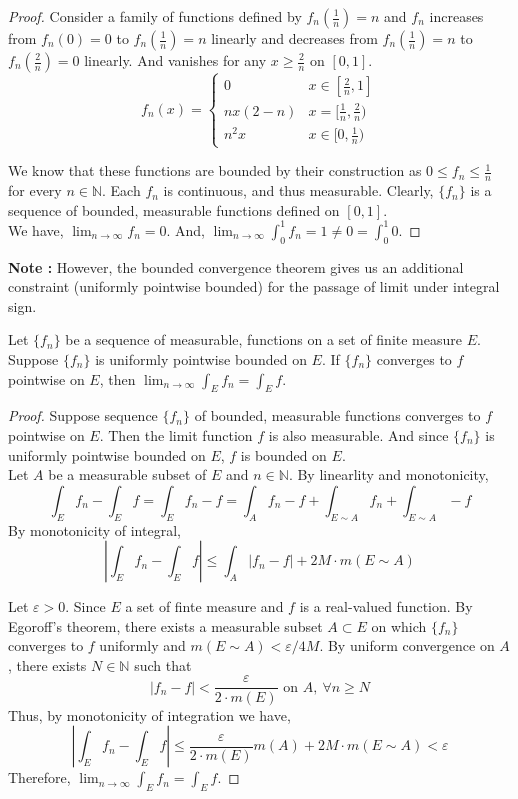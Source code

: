 \begin{proof}
	Consider a family of functions defined by $f_n(\frac{1}{n}) = n$ and $f_n$ increases from $f_n(0) = 0$ to $f_n(\frac{1}{n}) = n$ linearly and decreases from $f_n(\frac{1}{n}) = n$ to $f_n(\frac{2}{n}) = 0$ linearly. And vanishes for any $x \ge \frac{2}{n}$ on $[0,1]$.
	\[ f_n(x) = \begin{cases} 0 & x \in [\frac{2}{n},1] \\ nx(2-n) & x = [\frac{1}{n},\frac{2}{n}) \\ n^2 x & x \in [0,\frac{1}{n}) \end{cases} \]

	We know that these functions are bounded by their construction as $0 \le f_n \le \frac{1}{n}$ for every $n \in \mathbb{N}$.
	Each $f_n$ is continuous, and thus measurable.
	Clearly, $\{ f_n \}$ is a sequence of bounded, measurable functions defined on $[0,1]$.\\

	We have, $\displaystyle \lim_{n \to \infty} f_n = 0$.
	And, $\displaystyle \lim_{n \to \infty}\int_0^1 f_n  = 1 \ne 0 = \int_0^1 0$.
\end{proof}
	\textbf{Note :} However, the bounded convergence theorem gives us an additional constraint (uniformly pointwise bounded) for the passage of limit under integral sign.
\begin{theorem}
	Let $\{ f_n \}$ be a sequence of measurable, functions on a set of finite measure $E$.
	Suppose $\{ f_n \}$ is uniformly pointwise bounded on $E$.
	If $\{ f_n \}$ converges to $f$ pointwise on $E$, then $\displaystyle \lim_{n \to \infty} \int_E f_n = \int_E f$.
\end{theorem}
\begin{proof}
	Suppose sequence $\{ f_n \}$ of bounded, measurable functions converges to $f$ pointwise on $E$.
	Then the limit function $f$ is also measurable.
	And since $\{ f_n \}$ is uniformly pointwise bounded on $E$, $f$ is bounded on $E$.\\

	Let $A$ be a measurable subset of $E$ and $n \in \mathbb{N}$.
	By linearlity and monotonicity,
	\[ \int_E f_n - \int_E f = \int_E f_n - f = \int_A f_n - f + \int_{E \sim A} f_n + \int_{E \sim A}-f \]
	By monotonicity of integral,
	\begin{equation}
	 	\left| \int_E f_n - \int_E f \right| \le \int_A |f_n - f| + 2M \cdot m(E \sim A)
	\end{equation}

	Let $\varepsilon > 0$.
	Since $E$ a set of finte measure and $f$ is a real-valued function.
	By Egoroff's theorem, there exists a measurable subset $A \subset E$ on which $\{ f_n \}$ converges to $f$ uniformly and $m(E \sim A ) < \varepsilon/4M$.
	By uniform convergence on $A$, there exists $N \in \mathbb{N}$ such that
	\[ |f_n - f| < \frac{\varepsilon}{2 \cdot m(E)} \text{ on } A,\ \forall n \ge N \]
	Thus, by monotonicity of integration we have,
	\[ \left| \int_E f_n - \int_E f \right| \le \frac{\varepsilon}{2 \cdot m(E)} m(A) + 2M \cdot m(E \sim A) < \varepsilon \]
	Therefore, $\displaystyle \lim_{n \to \infty} \int_E f_n = \int_E f$.
\end{proof}

